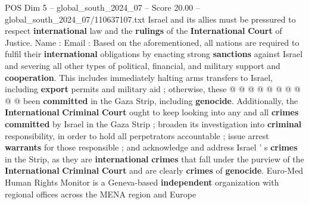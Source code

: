 \begin{textsample}{POS Dim 5 – global\_south\_2024\_07 – Score 20.00 – global\_south\_2024\_07/110637107.txt}
Israel and its allies must be pressured to respect \textbf{international} law and the \textbf{rulings} of the \textbf{International} \textbf{Court} of Justice.
Name : Email : Based on the aforementioned, all nations are required to fulfil their \textbf{international} obligations by enacting strong \textbf{sanctions} against Israel and severing all other types of political, financial, and military support and \textbf{cooperation}.
This includes immediately halting arms transfers to Israel, including \textbf{export} permits and military aid ; otherwise, these @ @ @ @ @ @ @ @ @ @ been \textbf{committed} in the Gaza Strip, including \textbf{genocide}.
Additionally, the \textbf{International} \textbf{Criminal} \textbf{Court} ought to keep looking into any and all \textbf{crimes} \textbf{committed} by Israel in the Gaza Strip ; broaden its investigation into \textbf{criminal} responsibility, in order to hold all perpetrators accountable ; issue arrest \textbf{warrants} for those responsible ; and acknowledge and address Israel ' s \textbf{crimes} in the Strip, as they are \textbf{international} \textbf{crimes} that fall under the purview of the \textbf{International} \textbf{Criminal} \textbf{Court} and are clearly \textbf{crimes} of \textbf{genocide}.
Euro-Med Human Rights Monitor is a Geneva-based \textbf{independent} organization with regional offices across the MENA region and Europe

\end{textsample}

